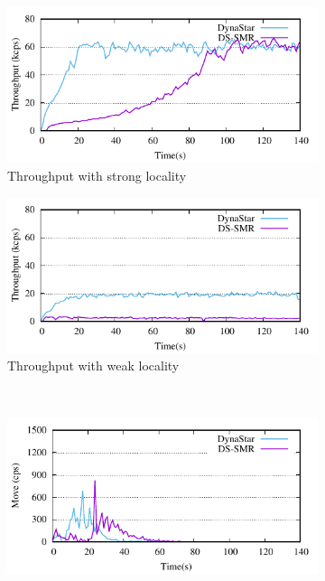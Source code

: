\begin{figure}[ht!]
  \centering
  \begin{subfigure}[b]{0.45\textwidth}
    \centering
    \includegraphics[width=0.95\columnwidth]{figures/experiments/dynastar-vs-dssmr-4p-0-tp}
    \caption{Throughput with strong locality}
  \end{subfigure}
  \begin{subfigure}[b]{0.45\textwidth}
    \centering
    \includegraphics[width=0.95\columnwidth]{figures/experiments/dynastar-vs-dssmr-4p-5-tp}
    \caption{Throughput with weak locality}
  \end{subfigure} \\
  \begin{subfigure}[b]{0.45\textwidth}
    \centering
    \includegraphics[width=0.95\columnwidth]{figures/experiments/dynastar-vs-dssmr-4p-0-move}

\end{subfigure}
\end{figure}
